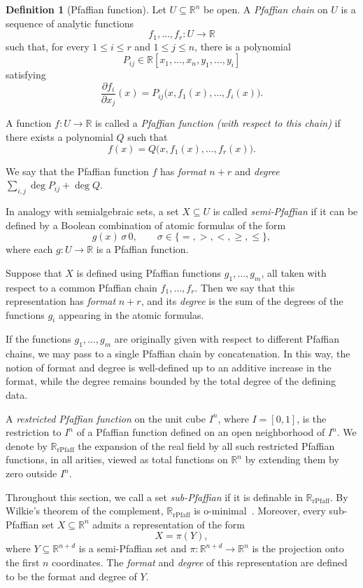 \documentclass[11pt]{article}
\theoremstyle{plain}
\theoremstyle{definition}
\newtheorem{definition}[theorem]{Definition}
\theoremstyle{remark}
\newcommand{\R}{\mathbb{R}}
\newcommand{\rPfaff}{\operatorname{rPfaff}}
\begin{document}
\begin{definition}[Pfaffian function]\label{def:pfaff}
Let \(U \subseteq \R^n\) be open. A \emph{Pfaffian chain} on \(U\) is a sequence
of analytic functions
\[
  f_1,\ldots,f_r\colon U \to \R
\]
such that, for every \(1 \le i \le r\) and \(1 \le j \le n\), there is a
polynomial
\[
  P_{ij} \in \R[x_1,\ldots,x_n,y_1,\ldots,y_i]
\]
satisfying
\[
  \frac{\partial f_i}{\partial x_j}(x)
  =
  P_{ij}\bigl(x,f_1(x),\ldots,f_i(x)\bigr).
\]

A function \(f\colon U\to \R\) is called a \emph{Pfaffian function (with respect to this chain)}
if there exists a polynomial \(Q\) such that
\[
  f(x)=Q\bigl(x,f_1(x),\ldots,f_r(x)\bigr).
\]

We say that the Pfaffian function \(f\) has \emph{format} \(n+r\) and
\emph{degree} \(\sum_{i,j} \deg P_{ij} + \deg Q\).

In analogy with semialgebraic sets, a set \(X \subseteq U\) is called
\emph{semi-Pfaffian} if it can be defined by a Boolean combination of
atomic formulas of the form
\[
  g(x)\,\sigma\,0,
  \qquad
  \sigma\in\{=,>,<,\ge,\le\},
\]
where each \(g\colon U\to\R\) is a Pfaffian function.

Suppose that \(X\) is defined using Pfaffian functions
\(g_1,\ldots,g_m\), all taken with respect to a common Pfaffian chain
\(f_1,\ldots,f_r\). Then we say that this representation has
\emph{format} \(n+r\), and its \emph{degree} is the sum of the degrees
of the functions \(g_i\) appearing in the atomic formulas.

If the functions \(g_1,\ldots,g_m\) are originally given with respect to
different Pfaffian chains, we may pass to a single Pfaffian chain by
concatenation. In this way, the notion of format and degree is well-defined
up to an additive increase in the format, while the degree remains bounded
by the total degree of the defining data.
\end{definition}


A \emph{restricted Pfaffian function} on the unit cube \(I^n\), where
\(I=[0,1]\), is the restriction to \(I^n\) of a Pfaffian function defined on
an open neighborhood of \(I^n\).
We denote by \(\R_{\rPfaff}\) the
expansion of the real field by all such restricted Pfaffian functions, in all
arities, viewed as total functions on \(\R^n\) by extending them by zero
outside \(I^n\).

Throughout this section, we call a set \emph{sub-Pfaffian} if it is definable
in \(\R_{\rPfaff}\). By Wilkie's theorem of the complement,
\(\R_{\rPfaff}\) is o-minimal~\cite{Wilkie1999Complement}. Moreover, every
sub-Pfaffian set \(X \subseteq \R^n\) admits a representation of the form
\[
X = \pi(Y),
\]
where \(Y \subseteq \R^{n+d}\) is a semi-Pfaffian set and
\(\pi\colon \R^{n+d} \to \R^n\) is the projection onto the first \(n\)
coordinates. The \emph{format} and \emph{degree} of this representation are
defined to be the format and degree of \(Y\).
\end{document}
